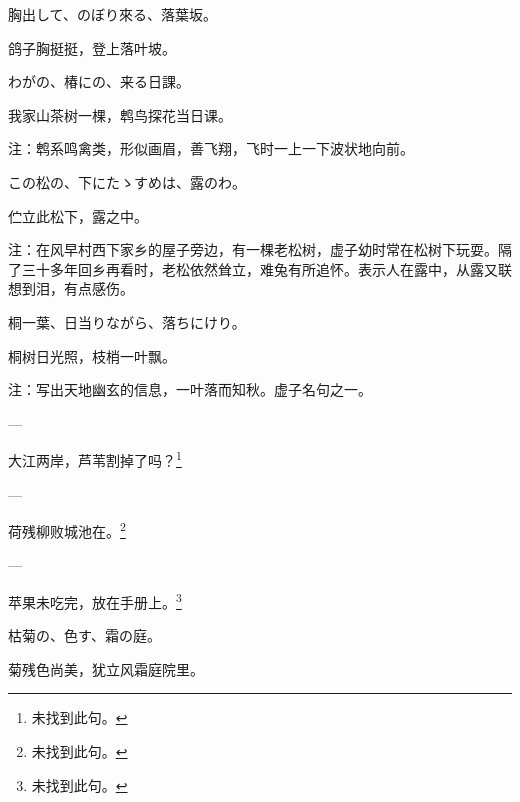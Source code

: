 \begin{haiku}
    {\FH 胸出して、のぼり來る、落葉坂。}

    {\FK 鸽子胸挺挺，登上落叶坡。}
\end{haiku}

\begin{haiku}
    {\FH わがの、椿にの、来る日課。}

    {\FK 我家山茶树一棵，鹎鸟探花当日课。}

    {\FT 注：鹎系鸣禽类，形似画眉，善飞翔，飞时一上一下波状地向前。}
\end{haiku}

\begin{haiku}
    {\FH この松の、下にたゝすめは、露のわ。}

    {\FK 伫立此松下，露之中。}

    {\FT 注：在风早村西下家乡的屋子旁边，有一棵老松树，虚子幼时常在松树下玩耍。隔了三十多年回乡再看时，老松依然耸立，难兔有所追怀。表示人在露中，从露又联想到泪，有点感伤。}
\end{haiku}

\begin{haiku}
    {\FH 桐一葉、日当りながら、落ちにけり。}

    {\FK 桐树日光照，枝梢一叶飘。}

    {\FT 注：写出天地幽玄的信息，一叶落而知秋。虚子名句之一。}
\end{haiku}

\begin{haiku}
    {\FH ---}

    {\FK 大江两岸，芦苇割掉了吗？\footnote{\FT 未找到此句。}}
\end{haiku}

\begin{haiku}
    {\FH ---}

    {\FK 荷残柳败城池在。\footnote{\FT 未找到此句。}}
\end{haiku}

\begin{haiku}
    {\FH ---}

    {\FK 苹果未吃完，放在手册上。\footnote{\FT 未找到此句。}}
\end{haiku}

\begin{haiku}
    {\FH 枯菊の、色す、霜の庭。}

    {\FK 菊残色尚美，犹立风霜庭院里。}
\end{haiku}

